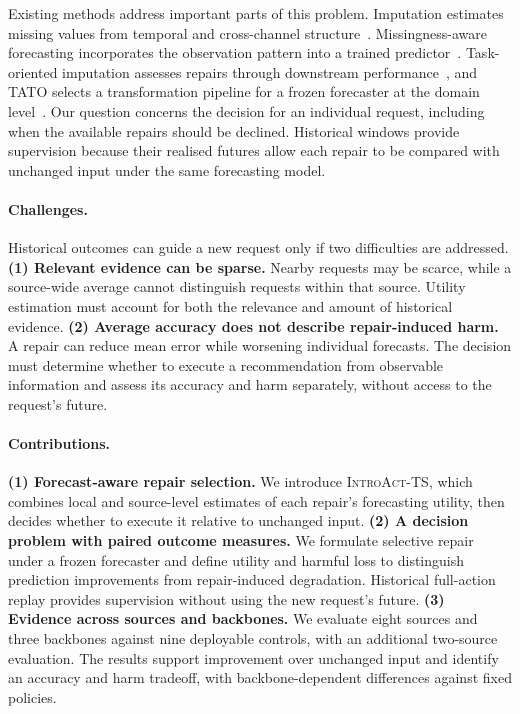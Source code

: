 \documentclass{article}
\newcommand{\introact}{\textsc{IntroAct-TS}}
\begin{document}
Existing methods address important parts of this problem. Imputation estimates missing
values from temporal and cross-channel structure~\citep{cao2018brits,tashiro2021csdi,du2023saits}.
Missingness-aware forecasting incorporates the observation pattern into a trained
predictor~\citep{chen2024bitgraph,peng2025s4m}. Task-oriented imputation assesses repairs
through downstream performance~\citep{wang2024taskoriented,hao2025toivsf,xu2026srdi}, and
TATO selects a transformation pipeline for a frozen forecaster at the domain
level~\citep{qiu2026tato}. Our question concerns the decision for an individual request,
including when the available repairs should be declined. Historical windows provide
supervision because their realised futures allow each repair to be compared with unchanged
input under the same forecasting model.

\paragraph{Challenges.}
Historical outcomes can guide a new request only if two difficulties are addressed.
\textbf{(1) Relevant evidence can be sparse.} Nearby requests may be scarce, while a
source-wide average cannot distinguish requests within that source. Utility estimation must
account for both the relevance and amount of historical evidence.
\textbf{(2) Average accuracy does not describe repair-induced harm.} A repair can reduce
mean error while worsening individual forecasts. The decision must determine whether to
execute a recommendation from observable information and assess its accuracy and harm
separately, without access to the request's future.

\paragraph{Contributions.}
\textbf{(1) Forecast-aware repair selection.} We introduce \introact{}, which combines
local and source-level estimates of each repair's forecasting utility, then decides whether
to execute it relative to unchanged input.
\textbf{(2) A decision problem with paired outcome measures.} We formulate selective
repair under a frozen forecaster and define utility and harmful loss to distinguish
prediction improvements from repair-induced degradation. Historical full-action replay
provides supervision without using the new request's future.
\textbf{(3) Evidence across sources and backbones.} We evaluate eight sources and three
backbones against nine deployable controls, with an additional two-source evaluation.
The results support improvement over unchanged input and identify an accuracy and harm
tradeoff, with backbone-dependent differences against fixed policies.
\end{document}
